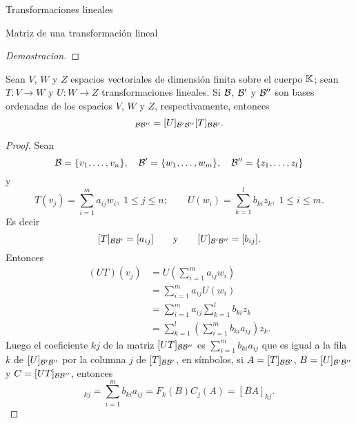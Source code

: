 \begin{chapter}{Transformaciones lineales}
\begin{section}{Matriz de una transformaci\'on lineal}
\begin{proof}[Demostracion]
        \end{proof}
    
        
        
        \begin{teorema}\label{th-producto-de-matrices-bases}
            Sean $V$, $W$ y $Z$ espacios vectoriales de dimensión finita sobre el cuerpo $\mathbb K$; sean $T: V \to W$ y $U: W \to Z$  transformaciones lineales.  Si $\mathcal{B}$, $\mathcal{B}'$ y $\mathcal{B}''$ son bases ordenadas de los espacios $V$, $W$ y $Z$, respectivamente, entonces
            \begin{equation}
                [UT]_{\cB\cB''} = 	[U]_{\cB'\cB''} 	[T]_{\cB\cB'}.  
            \end{equation} 
        \end{teorema}
        \begin{proof} 
            Sean
            \begin{equation*}
                 \mathcal{B} = \{v_1,\ldots,v_n\},\quad\mathcal{B}' = \{w_1,\ldots,w_m\},\quad  \mathcal{B}''= \{z_1,\ldots,z_l\}
            \end{equation*}
            y
            \begin{equation*}
            T(v_j) = \sum_{i=1}^m a_{ij} w_i, \; 1 \le j \le n; \qquad U(w_i) = \sum_{k=1}^l b_{ki} z_k, \; 1 \le i \le m.
            \end{equation*}
            Es decir 
            $$
            [T]_{\mathcal{B}\mathcal{B}'} = [a_{ij}]\qquad \text{y} \qquad [U]_{\mathcal{B}'\mathcal{B}''} = [b_{ij}]. 
            $$
            Entonces
            \begin{align*}
                (UT)(v_j) &= U(\sum_{i=1}^m a_{ij} w_i) \\
                &=  \sum_{i=1}^m a_{ij} U(w_i) \\
                &=  \sum_{i=1}^m a_{ij} \sum_{k=1}^l b_{ki} z_k \\
                &= \sum_{k=1}^l(\sum_{i=1}^m  b_{ki}a_{ij})  z_k.
            \end{align*}
            Luego el coeficiente $kj$ de la matriz $[UT]_{\mathcal{B}\mathcal{B}''}$ es $\sum_{i=1}^m  b_{ki}a_{ij}$ que es igual a la fila $k$ de $[U]_{\mathcal{B}'\mathcal{B}''}$ por la columna $j$ de  $[T]_{\mathcal{B}\mathcal{B}'}$,  en símbolos,  si $A= 	[T]_{\mathcal{B}\mathcal{B}'}$, $B = 	[U]_{\mathcal{B}'\mathcal{B}''}$ y $C = 	[UT]_{\mathcal{B}\mathcal{B}''}$, entonces
            \begin{equation*}
                [C]_{kj} = \sum_{i=1}^m  b_{ki}a_{ij} = F_k(B)C_j(A) = [BA]_{kj}.
            \end{equation*}
        \end{proof}	
            

\end{section}
\end{chapter}

